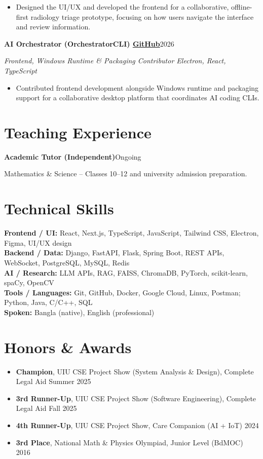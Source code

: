 \documentclass[10pt, a4paper]{article}
\newcommand{\entry}[2]{\par\textbf{#1}\hfill #2\par}
\newcommand{\sub}[1]{\textit{#1}\par}
\begin{document}
\begin{itemize}
    \item Designed the UI/UX and developed the frontend for a collaborative, offline-first radiology triage prototype, focusing on how users navigate the interface and review information.
\end{itemize}
\entry{AI Orchestrator (OrchestratorCLI) \textbar{} \href{https://github.com/Tanjamul-Azad/OrchestratorCLI}{GitHub}}{2026}
\sub{Frontend, Windows Runtime \& Packaging Contributor \textbar{} Electron, React, TypeScript}
\begin{itemize}
    \item Contributed frontend development alongside Windows runtime and packaging support for a collaborative desktop platform that coordinates AI coding CLIs.
\end{itemize}

\section{Teaching Experience}
\entry{Academic Tutor (Independent)}{Ongoing}
Mathematics \& Science -- Classes 10--12 and university admission preparation.

\section{Technical Skills}
\textbf{Frontend / UI:} React, Next.js, TypeScript, JavaScript, Tailwind CSS, Electron, Figma, UI/UX design\\
\textbf{Backend / Data:} Django, FastAPI, Flask, Spring Boot, REST APIs, WebSocket, PostgreSQL, MySQL, Redis\\
\textbf{AI / Research:} LLM APIs, RAG, FAISS, ChromaDB, PyTorch, scikit-learn, spaCy, OpenCV\\
\textbf{Tools / Languages:} Git, GitHub, Docker, Google Cloud, Linux, Postman; Python, Java, C/C++, SQL\\
\textbf{Spoken:} Bangla (native), English (professional)

\section{Honors \& Awards}
\begin{itemize}
    \item \textbf{Champion}, UIU CSE Project Show (System Analysis \& Design),
    Complete Legal Aid \hfill Summer 2025
    \item \textbf{3rd Runner-Up}, UIU CSE Project Show (Software Engineering),
    Complete Legal Aid \hfill Fall 2025
    \item \textbf{4th Runner-Up}, UIU CSE Project Show, Care Companion (AI + IoT) \hfill 2024
    \item \textbf{3rd Place}, National Math \& Physics Olympiad, Junior Level (BdMOC) \hfill 2016
\end{itemize}
\end{document}
